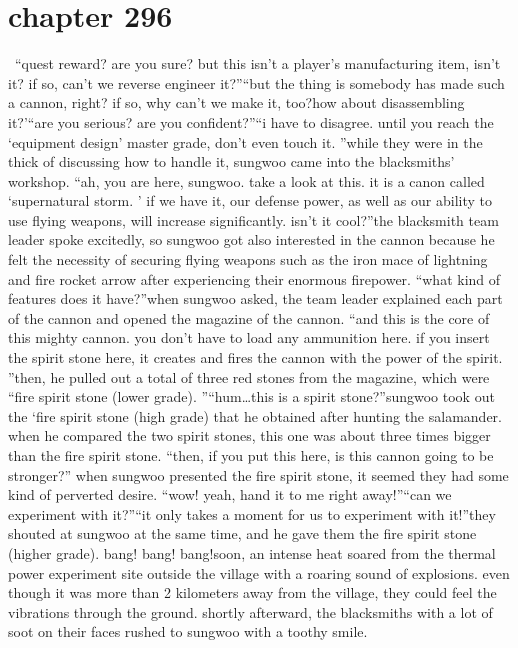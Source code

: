 \section{chapter 296}






 “quest reward? are you sure? but this isn’t a player’s manufacturing item, isn’t it? if so, can’t we reverse engineer it?”“but the thing is somebody has made such a cannon, right? if so, why can’t we make it, too?how about disassembling it?’“are you serious? are you confident?”“i have to disagree.
 until you reach the ‘equipment design’ master grade, don’t even touch it.
”while they were in the thick of discussing how to handle it, sungwoo came into the blacksmiths’ workshop.
“ah, you are here, sungwoo.
 take a look at this.
 it is a canon called ‘supernatural storm.
’ if we have it, our defense power, as well as our ability to use flying weapons, will increase significantly.
 isn’t it cool?”the blacksmith team leader spoke excitedly, so sungwoo got also interested in the cannon because he felt the necessity of securing flying weapons such as the iron mace of lightning and fire rocket arrow after experiencing their enormous firepower.
“what kind of features does it have?”when sungwoo asked, the team leader explained each part of the cannon and opened the magazine of the cannon.
“and this is the core of this mighty cannon.
 you don’t have to load any ammunition here.
 if you insert the spirit stone here, it creates and fires the cannon with the power of the spirit.
”then, he pulled out a total of three red stones from the magazine, which were “fire spirit stone (lower grade).
”“hum…this is a spirit stone?”sungwoo took out the ‘fire spirit stone (high grade) that he obtained after hunting the salamander.
 when he compared the two spirit stones, this one was about three times bigger than the fire spirit stone.
“then, if you put this here, is this cannon going to be stronger?”
when sungwoo presented the fire spirit stone, it seemed they had some kind of perverted desire.
“wow! yeah, hand it to me right away!”“can we experiment with it?”“it only takes a moment for us to experiment with it!”they shouted at sungwoo at the same time, and he gave them the fire spirit stone (higher grade).
bang! bang! bang!soon, an intense heat soared from the thermal power experiment site outside the village with a roaring sound of explosions.
 even though it was more than 2 kilometers away from the village, they could feel the vibrations through the ground.
shortly afterward, the blacksmiths with a lot of soot on their faces rushed to sungwoo with a toothy smile.
